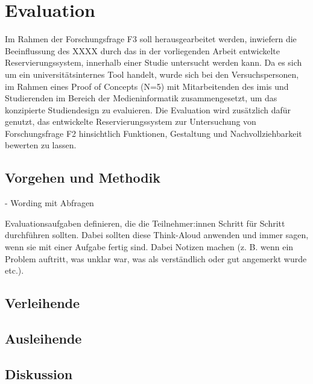 
\chapter{Evaluation}
\label{chapter-evaluation}
Im Rahmen der Forschungsfrage F3 soll herausgearbeitet werden, inwiefern die Beeinflussung des XXXX
durch das in der vorliegenden Arbeit entwickelte Reservierungssystem, innerhalb einer Studie
untersucht werden kann. Da es sich um ein universitätsinternes Tool handelt, wurde sich bei den
Versuchspersonen, im Rahmen eines Proof of Concepts (N=5) mit Mitarbeitenden des \ac{imis} und
Studierenden im Bereich der Medieninformatik zusammengesetzt, um das konzipierte Studiendesign
zu evaluieren. Die Evaluation wird zusätzlich dafür genutzt, das entwickelte Reservierungssystem zur
Untersuchung von Forschungsfrage F2 hinsichtlich Funktionen, Gestaltung und
Nachvollziehbarkeit bewerten zu lassen.


\section{Vorgehen und Methodik}
- Wording mit Abfragen


Evaluationsaufgaben definieren, die die Teilnehmer:innen Schritt für Schritt durchführen sollten. 
Dabei sollten diese Think-Aloud anwenden und immer sagen, wenn sie mit einer Aufgabe fertig sind. 
Dabei Notizen machen (z. B. wenn ein Problem auftritt, was unklar war, was als verständlich oder gut angemerkt wurde etc.).


\section{Verleihende}

\section{Ausleihende}


\section{Diskussion}